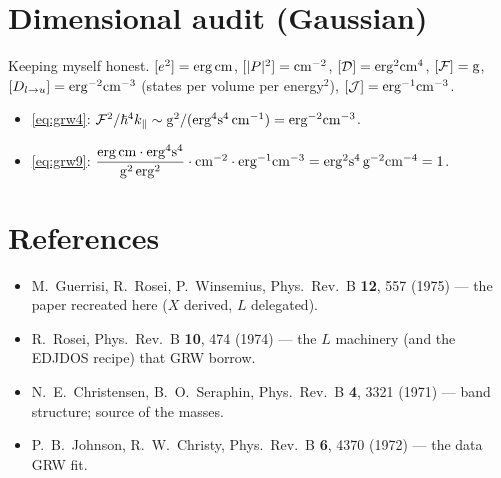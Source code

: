 \documentclass[11pt,a4paper]{article}
\numberwithin{equation}{section}
\newcommand{\cD}{\mathcal{D}}
\newcommand{\cF}{\mathcal{F}}
\newcommand{\cJ}{\mathcal{J}}%
\newcommand{\kpar}{k_{\parallel}}
\begin{document}
\section{Dimensional audit (Gaussian)}

Keeping myself honest. $[e^2]={\rm erg\,cm}$, $[|P|^2]={\rm cm^{-2}}$,
$[\cD]={\rm erg^2cm^4}$, $[\cF]={\rm g}$,
$[D_{l\to u}]={\rm erg^{-2}cm^{-3}}$ (states per volume per
energy$^2$), $[\cJ]={\rm erg^{-1}cm^{-3}}$.
\begin{itemize}
\item \eqref{eq:grw4}:
$\cF^2/\hbar^4\kpar\sim{\rm g^2}/({\rm erg^4s^4\,cm^{-1}})
={\rm erg^{-2}cm^{-3}}$.\ \checkmark
\item \eqref{eq:grw9}:
$\dfrac{{\rm erg\,cm}\cdot{\rm erg^4s^4}}{{\rm g^2\,erg^2}}
\cdot{\rm cm^{-2}}\cdot{\rm erg^{-1}cm^{-3}}
={\rm erg^2s^4\,g^{-2}cm^{-4}}=1$.\ \checkmark
\end{itemize}

\section*{References}
\begin{itemize}
\item M.~Guerrisi, R.~Rosei, P.~Winsemius, Phys.\ Rev.\ B
\textbf{12}, 557 (1975) --- the paper recreated here ($X$ derived,
$L$ delegated).
\item R.~Rosei, Phys.\ Rev.\ B \textbf{10}, 474 (1974) --- the $L$
machinery (and the EDJDOS recipe) that GRW borrow.
\item N.~E.~Christensen, B.~O.~Seraphin, Phys.\ Rev.\ B \textbf{4},
3321 (1971) --- band structure; source of the masses.
\item P.~B.~Johnson, R.~W.~Christy, Phys.\ Rev.\ B \textbf{6}, 4370
(1972) --- the data GRW fit.
\end{itemize}
\end{document}
